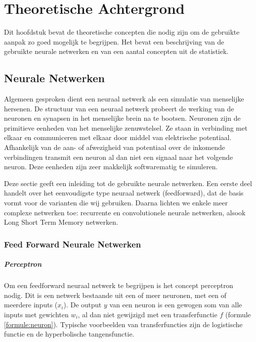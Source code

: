 \chapter{Theoretische Achtergrond}
\label{hst-theorie}
Dit hoofdstuk bevat de theoretische concepten die nodig zijn om de gebruikte aanpak zo goed mogelijk te begrijpen. Het bevat een beschrijving van de gebruikte neurale netwerken en van een aantal concepten uit de statistiek.

\section{Neurale Netwerken}
Algemeen gesproken dient een neuraal netwerk als een simulatie van menselijke hersenen. De structuur van een neuraal netwerk probeert de werking van de neuronen en synapsen in het menselijke brein na te bootsen. Neuronen zijn de primitieve eenheden van het menselijke zenuwstelsel. Ze staan in verbinding met elkaar en communiceren met elkaar door middel van elektrische potentiaal. Afhankelijk van de aan- of afwezigheid van potentiaal over de inkomende verbindingen transmit een neuron al dan niet een signaal naar het volgende neuron. Deze eenheden zijn zeer makkelijk softwarematig te simuleren.

Deze sectie geeft een inleiding tot de gebruikte neurale netwerken. Een eerste deel handelt over het eenvoudigste type neuraal netwerk (feedforward), dat de basis vormt voor de varianten die wij gebruiken. Daarna lichten we enkele meer complexe netwerken toe: recurrente en convolutionele neurale netwerken, alsook Long Short Term Memory netwerken.

\subsection{Feed Forward Neurale Netwerken}
\paragraph{Perceptron} %
\label{par:perceptron}

Om een feedforward neuraal netwerk te begrijpen is het concept perceptron nodig. Dit is een netwerk bestaande uit een of meer neuronen, met een of meerdere inputs ($x_i$). De output $y$ van een neuron is een gewogen som van alle inputs met gewichten $w_i$, al dan niet gewijzigd met een transferfunctie $f$ (formule \ref{formule:neuron}). Typische voorbeelden van transferfuncties zijn de logistische functie en de hyperbolische tangensfunctie.

